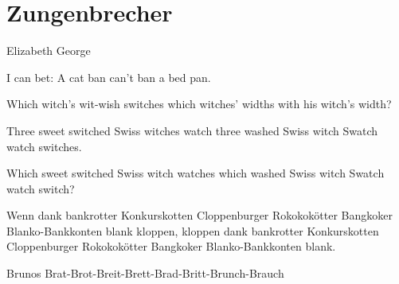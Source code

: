 \section{Zungenbrecher}
\label{zungenbrecher}

Elizabeth George

I can bet: A cat ban can't ban a bed pan.

Which witch's wit-wish switches which witches' widths with his witch's width?

Three sweet switched Swiss witches watch three washed Swiss witch Swatch watch switches.

Which sweet switched Swiss witch watches which washed Swiss witch Swatch watch switch?


Wenn dank bankrotter Konkurskotten Cloppenburger Rokokokötter Bangkoker Blanko-Bankkonten blank kloppen, kloppen dank bankrotter Konkurskotten Cloppenburger Rokokokötter Bangkoker Blanko-Bankkonten blank.

Brunos Brat-Brot-Breit-Brett-Brad-Britt-Brunch-Brauch
